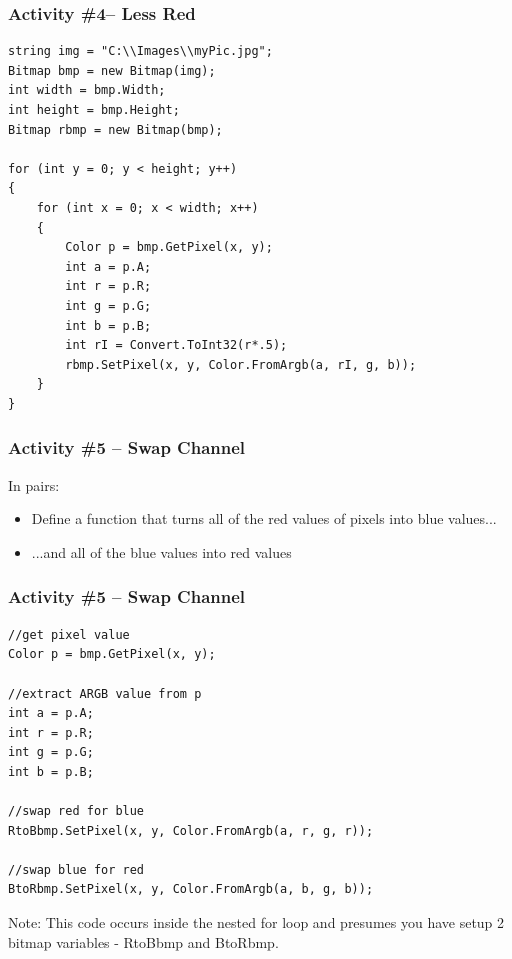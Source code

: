 \begin{frame}[fragile]
	\frametitle{Activity \#4-- Less Red}

\begin{lstlisting}
string img = "C:\\Images\\myPic.jpg";
Bitmap bmp = new Bitmap(img);
int width = bmp.Width;
int height = bmp.Height;
Bitmap rbmp = new Bitmap(bmp);

for (int y = 0; y < height; y++)
{
	for (int x = 0; x < width; x++)
	{
		Color p = bmp.GetPixel(x, y);
		int a = p.A;
		int r = p.R;
		int g = p.G;
		int b = p.B;
		int rI = Convert.ToInt32(r*.5);	
		rbmp.SetPixel(x, y, Color.FromArgb(a, rI, g, b));
	}
}
\end{lstlisting}

\end{frame}

\begin{frame}
	\frametitle{Activity \#5 -- Swap Channel}
	
	In pairs:
	
	\vspace{2em}
	
	\begin{itemize}
		\item Define a function that turns all of the red values of pixels into blue values...
		\item ...and all of the blue values into red values
	\end{itemize}
\end{frame}

\begin{frame}[fragile]
	\frametitle{Activity \#5 -- Swap Channel}
	
\begin{lstlisting}
//get pixel value
Color p = bmp.GetPixel(x, y);

//extract ARGB value from p
int a = p.A;
int r = p.R;
int g = p.G;
int b = p.B;

//swap red for blue
RtoBbmp.SetPixel(x, y, Color.FromArgb(a, r, g, r));

//swap blue for red
BtoRbmp.SetPixel(x, y, Color.FromArgb(a, b, g, b));
\end{lstlisting}

Note: This code occurs inside the nested for loop and presumes you have setup 2 bitmap variables - RtoBbmp and BtoRbmp.

\end{frame}

